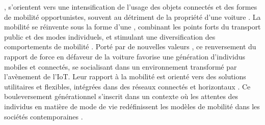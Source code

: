 \begin{refsegment}
{}, s'orientent vers une intensification de l'usage des objets connectés et des formes de mobilité opportunistes, souvent au détriment de la propriété d'une voiture \textcolor{blue}{\autocite[25]{litman_future_2020}}. La mobilité se réinvente sous la forme d’une , combinant les points forts du transport public et des modes individuels, et stimulant une diversification des comportements de mobilité \textcolor{blue}{\autocite[20]{amar_du_2012}}. Porté par de nouvelles valeurs \textcolor{blue}{\autocite{lacombled_smart_2014}}, ce renversement du rapport de force en défaveur de la voiture favorise une génération d’individus mobiles et connectés, se socialisant dans un environnement transformé par l’avènement de l'\acrshort{IoT}. Leur rapport à la mobilité est orienté vers des solutions utilitaires et flexibles, intégrées dans des réseaux connectés et horizontaux \textcolor{blue}{\autocite{bloomberg_citylab_clearest_2015}}. Ce bouleversement générationnel s’inscrit dans un contexte où les attentes des individus en matière de mode de vie redéfinissent les modèles de mobilité dans les sociétés contemporaines \textcolor{blue}{\autocites{circella_what_2016}{garikapati_activity_2016}{tilley_multi-level_2017}}.%


\end{refsegment}
